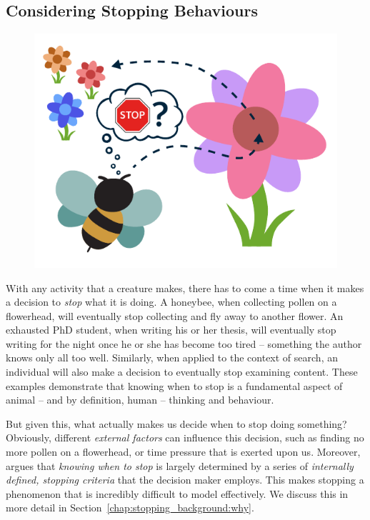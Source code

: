 \subsection{Considering Stopping Behaviours}\label{sec:intro:stopping}
\begin{figure}
    \begin{center}
    \vspace*{-10mm}
    \includegraphics[width=1\textwidth]{figures/ch1-bee.pdf}
    \end{center}
    \vspace*{-4mm}
    \label{fig:bee}
\end{figure}

With any activity that a creature makes, there has to come a time when it makes a decision to \emph{stop} what it is doing. A honeybee, when collecting pollen on a flowerhead, will eventually stop collecting and fly away to another flower. An exhausted PhD student, when writing his or her thesis, will eventually stop writing for the night once he or she has become too tired -- something the author knows only all too well. Similarly, when applied to the context of search, an individual will also make a decision to eventually stop examining content. These examples demonstrate that knowing when to stop is a fundamental aspect of animal -- and by definition, human -- thinking and behaviour.

But given this, what actually makes us decide when to stop doing something? Obviously, different \emph{external factors} can influence this decision, such as finding no more pollen on a flowerhead, or time pressure that is exerted upon us. Moreover,~\citep{nickles1995judgment} argues that \emph{knowing when to stop} is largely determined by a series of \emph{internally defined, stopping criteria} that the decision maker employs. This makes stopping a phenomenon that is incredibly difficult to model effectively. We discuss this in more detail in Section~\ref{chap:stopping_background:why}.

